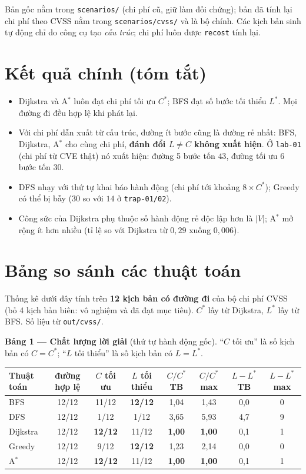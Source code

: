 \documentclass[11pt,a4paper]{article}
\newcommand{\Cs}{C^{*}}
\newcommand{\Ls}{L^{*}}
\newcommand{\V}{|V|}
\begin{document}
Bản gốc nằm trong \texttt{scenarios/} (chi phí cũ, giữ làm đối chứng); bản đã tính lại chi phí theo CVSS nằm trong \texttt{scenarios/cvss/} và là bộ chính. Các kịch bản sinh tự động chỉ do công cụ tạo \emph{cấu trúc}; chi phí luôn được \texttt{recost} tính lại.

\section{Kết quả chính (tóm tắt)}

\begin{itemize}
  \item Dijkstra và A$^{*}$ luôn đạt chi phí tối ưu $\Cs$; BFS đạt số bước tối thiểu $\Ls$. Mọi đường đi đều hợp lệ khi phát lại.
  \item Với chi phí dẫn xuất từ cấu trúc, đường ít bước cũng là đường rẻ nhất: BFS, Dijkstra, A$^{*}$ cho cùng chi phí, \textbf{đánh đổi $L\neq C$ không xuất hiện}. Ở \texttt{lab-01} (chi phí từ CVE thật) nó xuất hiện: đường 5 bước tốn $43$, đường tối ưu 6 bước tốn $30$.
  \item DFS nhạy với thứ tự khai báo hành động (chi phí tới khoảng $8\times\Cs$); Greedy có thể bị bẫy ($30$ so với $14$ ở \texttt{trap-01/02}).
  \item Công sức của Dijkstra phụ thuộc số hành động rẻ độc lập hơn là $\V$; A$^{*}$ mở rộng ít hơn nhiều (tỉ lệ so với Dijkstra từ $0{,}29$ xuống $0{,}006$).
\end{itemize}

\section{Bảng so sánh các thuật toán}
\label{sec:compare}

Thống kê dưới đây tính trên \textbf{12 kịch bản có đường đi} của bộ chi phí CVSS (bỏ 4 kịch bản biên: vô nghiệm và đã đạt mục tiêu). $\Cs$ lấy từ Dijkstra, $\Ls$ lấy từ BFS. Số liệu từ \texttt{out/cvss/}.

\textbf{Bảng 1 --- Chất lượng lời giải} (thứ tự hành động gốc). ``$C$ tối ưu'' là số kịch bản có $C=\Cs$; ``$L$ tối thiểu'' là số kịch bản có $L=\Ls$.

\begin{center}\small
\begin{tabular}{@{}lccccccc@{}}
\toprule
Thuật toán & đường hợp lệ & $C$ tối ưu & $L$ tối thiểu & $C/\Cs$ TB & $C/\Cs$ max & $L-\Ls$ TB & $L-\Ls$ max \\
\midrule
BFS      & 12/12 & 11/12 & \textbf{12/12} & 1,04 & 1,43 & 0,0 & 0 \\
DFS      & 12/12 & 1/12  & 1/12           & 3,65 & 5,93 & 4,7 & 9 \\
Dijkstra & 12/12 & \textbf{12/12} & 11/12 & \textbf{1,00} & \textbf{1,00} & 0,1 & 1 \\
Greedy   & 12/12 & 9/12  & \textbf{12/12} & 1,23 & 2,14 & 0,0 & 0 \\
A$^{*}$  & 12/12 & \textbf{12/12} & 11/12 & \textbf{1,00} & \textbf{1,00} & 0,1 & 1 \\
\bottomrule
\end{tabular}
\end{center}
\end{document}
